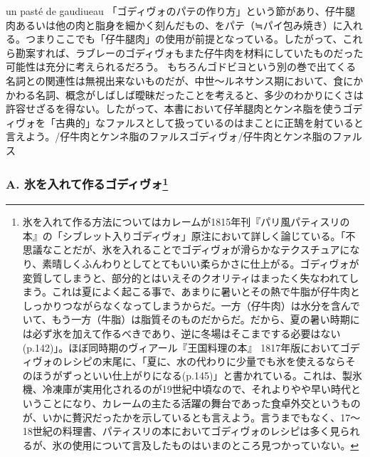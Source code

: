 {{{{  un pasté de gaudiueau
  「ゴディヴォのパテの作り方」という節があり、仔牛腿肉あるいは他の肉と脂身を細かく刻んだもの、をパテ（≒パイ包み焼き）に入れる。つまりここでも「仔牛腿肉」の使用が前提となっている。したがって、これら勘案すれば、ラブレーのゴディヴォもまた仔牛肉を材料にしていたものだった可能性は充分に考えられるだろう。
  もちろんゴドビヨという別の巻で出てくる名詞との関連性は無視出来ないものだが、中世〜ルネサンス期において、食にかかわる名詞、概念がしばしば曖昧だったことを考えると、多少のわかりにくさは許容せざるを得ない。したがって、本書において仔羊腿肉とケンネ脂を使うゴディヴォを「古典的」なファルスとして扱っているのはまことに正鵠を射ていると言えよう。}/仔牛肉とケンネ脂のファルス}{ゴディヴォ/仔牛肉とケンネ脂のファルス}}\label{godiveau}}


 

\hypertarget{godiveau-mouille-a-la-glace}{%
\subsubsection[A. 氷を入れて作るゴディヴォ]{\texorpdfstring{A.
氷を入れて作るゴディヴォ\footnote{氷を入れて作る方法についてはカレームが1815年刊『パリ風パティスリの本』の「シブレット入りゴディヴォ」原注において詳しく論じている。「不思議なことだが、氷を入れることでゴディヴォが滑らかなテクスチュアになり、素晴しくふんわりとしてとてもいい柔らかさに仕上がる。ゴディヴォが変質してしまうと、部分的とはいえそのクオリティはまったく失なわれてしまう。これは夏によく起こる事で、あまりに暑いとその熱で牛脂が仔牛肉としっかりつながらなくなってしまうからだ。一方（仔牛肉）は水分を含んでいて、もう一方（牛脂）は脂質そのものだからだ。だから、夏の暑い時期には必ず氷を加えて作るべきであり、逆に冬場はそこまでする必要はない(p.142)」。ほぼ同時期のヴィアール『王国料理の本』
  1817年版においてゴディヴォのレシピの末尾に、「夏に、水の代わりに少量でも氷を使えるならそのほうがずっといい仕上がりになる(p.145)」と書かれている。これは、製氷機、冷凍庫が実用化されるのが19世紀中頃なので、それよりやや早い時代ということになり、カレームの主たる活躍の舞台であった食卓外交というものが、いかに贅沢だったかを示しているとも言えよう。言うまでもなく、17〜18世紀の料理書、パティスリの本においてゴディヴォのレシピは多く見られるが、氷の使用について言及したものはいまのところ見つかっていない。}}{A. 氷を入れて作るゴディヴォ}}\label{godiveau-mouille-a-la-glace}}

